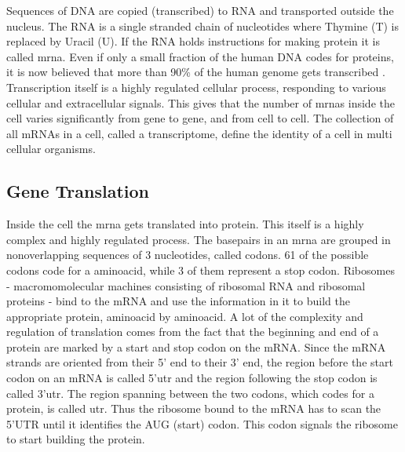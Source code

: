 \documentclass[12pt]{article}
\begin{document}
Sequences of DNA are copied (transcribed) to RNA and transported outside the nucleus. The RNA is a single stranded chain of nucleotides where Thymine (T) is replaced by Uracil (U). If the RNA holds instructions for making protein it is called \gls{mrna}. Even if only a small fraction of the human DNA codes for proteins, it is now believed that more than 90\% of the human genome gets transcribed \cite{Pertea2012}. Transcription itself is a highly regulated cellular process, responding to various cellular and extracellular signals\cite{Hahn2011}. This gives that the number of \acrshort{mrna}s inside the cell varies significantly from gene to gene, and from cell to cell. The collection of all mRNAs in a cell, called a transcriptome, define the identity of a cell in multi cellular organisms. 

\subsection{Gene Translation}
Inside the cell the \acrshort{mrna} gets translated into protein. This itself is a highly complex and highly regulated process. The basepairs in an \acrshort{mrna} are grouped in nonoverlapping sequences of 3 nucleotides, called codons. 61 of the possible codons code for a aminoacid, while 3 of them represent a stop codon. Ribosomes - macromomolecular machines consisting of ribosomal RNA and ribosomal proteins - bind to the mRNA and use the information in it to build the appropriate protein, aminoacid by aminoacid. A lot of the complexity and regulation of translation comes from the fact that the beginning and end of a protein are marked by a start and stop codon on the mRNA. Since the mRNA strands are oriented from their 5' end to their 3' end, the region before the start codon on an mRNA is called 5'\gls{utr} and the region following the stop codon is called 3'\acrshort{utr}. The region spanning  between the two codons, which codes for a protein, is  called \gls{utr}. Thus the ribosome bound to the mRNA has to scan the 5'UTR until it identifies the AUG (start) codon. This codon signals the ribosome to start building the protein. 
\end{document}
